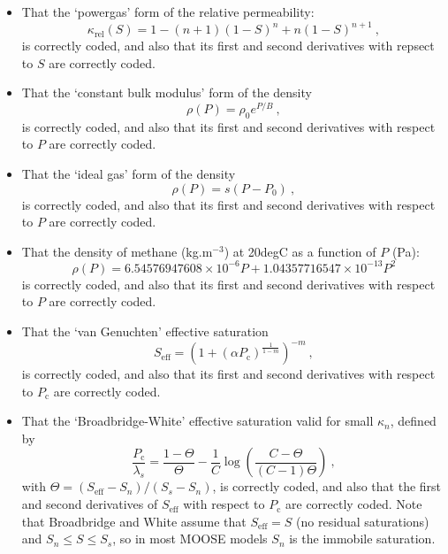\documentclass[]{scrreprt}
\begin{document}
\begin{itemize}
\item That the `powergas' form of the relative permeability:
\begin{equation}
\kappa_{\mathrm{rel}}(S) = 1 - (n+1)(1-S)^{n} + n(1-S)^{n+1} \ ,
\end{equation}
is correctly coded, and also that its first and second derivatives
with repsect to $S$ are correctly coded.


\item That the `constant bulk modulus' form of the density
\begin{equation}
\rho(P) = \rho_{0}e^{P/B} \ ,
\end{equation}
is correctly coded, and also that its first and second derivatives
with respect to $P$ are correctly coded.

\item That the `ideal gas' form of the density
\begin{equation}
\rho(P) = s(P-P_{\mathrm{0}}) \ ,
\end{equation}
is correctly coded, and also that its first and second derivatives
with respect to $P$ are correctly coded.

\item That the density of methane (kg.m$^{-3}$) at 20degC as a
  function of $P$ (Pa): 
\begin{equation}
\rho(P) = 6.54576947608\times 10^{-6}P + 1.04357716547\times 10^{-13} P^{2}
\end{equation}
is correctly coded, and also that its first and second derivatives
with respect to $P$ are correctly coded.

\item That the `van Genuchten' effective saturation
\begin{equation}
S_{\mathrm{eff}} = \left(1 + (\alpha
P_{\mathrm{c}})^{\frac{1}{1-m}}\right)^{-m} \ ,
\end{equation}
is correctly coded, and also that its first and second derivatives
with respect to $P_{\mathrm{c}}$ are correctly coded.

\item That the `Broadbridge-White' effective saturation valid for
  small $\kappa_{n}$, defined by
\begin{equation}
\frac{P_{\mathrm{c}}}{\lambda_{s}} = \frac{1-\Theta}{\Theta} - \frac{1}{C}\log
\left( \frac{C-\Theta}{(C-1)\Theta} \right) \ ,
\end{equation}
with $\Theta = (S_{\mathrm{eff}} - S_{n})/(S_{s}-S_{n})$, 
is correctly coded, and also that the first and second derivatives of
$S_{\mathrm{eff}}$ with respect to $P_{\mathrm{c}}$ are correctly
coded.  Note that Broadbridge and White assume that
$S_{\mathrm{eff}}=S$ (no residual saturations) and $S_{n}\leq S \leq
S_{s}$, so in most MOOSE models $S_{n}$ is the immobile saturation.


\end{itemize}
\end{document}
